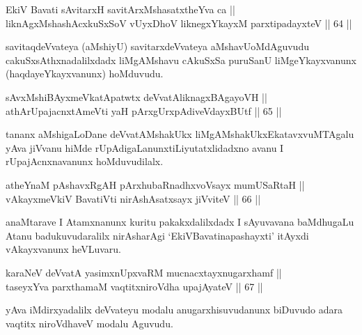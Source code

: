 \begin{shl}
EkiV Bavati sAvitarxH savitArxM\s shasatxtheYva ca || \\
liknAgxMshashAcxkuSxSoV vUyxDhoV liknegxYkayxM parxtipadayxteV \hfill || 64 ||  
\end{shl}

\begin{artha}
savitaqdeVvateya (aMshiyU) savitarxdeVvateya aMshavU\break oMdAguvudu
cakuSxsAthxnadalilxdadx liMgAMshavu cAkuSxSa puruSanU liMgeYkayxvanunx
(haqdayeYkayxvanunx) hoMduvudu.
\end{artha}


\begin{shl}
sAvxMshiBAyxmeVkatApatwtx deVvatAliknagxBAgayoVH || \\
athArUpajacnxtAmeVti yaH pArxgUrxpAdiveVdayxBUtf \hfill || 65 ||  
\end{shl}

\begin{artha}
tananx aMshigaLoDane deVvatAMshakUkx liMgAMshakUkx\break EkatavxvuMTAgalu
yAva jiVvanu hiMde rUpAdigaLanunx\break tiLiyutatxlidadxno avanu I
rUpajAcnxnavanunx hoMduvudilalx.
\end{artha}


\begin{shl}
atheYnaM pAshavxRgAH pArxhubaRnadhxvoV\s sayx mumUSaRtaH || \\
vAkayxmeVkiV BavatiVti nirAshAsatxsayx jiVviteV \hfill || 66 ||  
\end{shl}

\begin{artha}
anaMtarave I Atamxnanunx kuritu pakakxdalilxdadx I sAyu\-\break vavana
baMdhugaLu Atanu badukuvudaralilx nirAsharAgi `EkiVBavatinapashayxti'
itAyxdi vAkayxvanunx heVLuvaru.
\end{artha}


\begin{shl}
karaNeV deVvatA yasimxnUpxvaRM mucnacxtayxnugarxhamf || \\
taseyxYva parxthamaM vaqtitxniroVdha upajAyateV \hfill || 67 ||  
\end{shl}

\begin{artha}
yAva iMdirxyadalilx deVvateyu modalu anugarxhisuvudanunx biDuvudo
adara vaqtitx niroVdhaveV modalu Aguvudu.
\end{artha}

